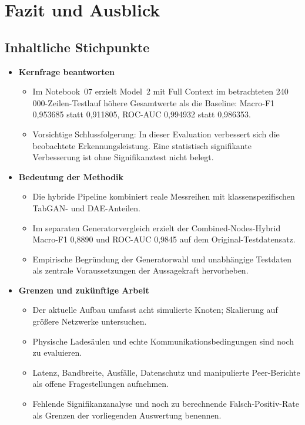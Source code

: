 \section{Fazit und Ausblick}
\label{sec:conclusion}

\subsection{Inhaltliche Stichpunkte}
\begin{itemize}
  \item \textbf{Kernfrage beantworten}
  \begin{itemize}
    \item Im Notebook~07 erzielt Model~2 mit Full Context im betrachteten
          240\,000-Zeilen-Testlauf höhere Gesamtwerte als die Baseline:
          Macro-F1 0{,}953685 statt 0{,}911805, ROC-AUC 0{,}994932 statt
          0{,}986353.
    \item Vorsichtige Schlussfolgerung: In dieser Evaluation verbessert
          sich die beobachtete Erkennungsleistung. Eine statistisch
          signifikante Verbesserung ist ohne Signifikanztest nicht belegt.
  \end{itemize}
  \item \textbf{Bedeutung der Methodik}
  \begin{itemize}
    \item Die hybride Pipeline kombiniert reale Messreihen mit
          klassenspezifischen TabGAN- und DAE-Anteilen.
    \item Im separaten Generatorvergleich erzielt der Combined-Nodes-Hybrid
          Macro-F1 0{,}8890 und ROC-AUC 0{,}9845 auf dem Original-Testdatensatz.
    \item Empirische Begründung der Generatorwahl und unabhängige
          Testdaten als zentrale Voraussetzungen der Aussagekraft hervorheben.
  \end{itemize}
  \item \textbf{Grenzen und zukünftige Arbeit}
  \begin{itemize}
    \item Der aktuelle Aufbau umfasst acht simulierte Knoten; Skalierung auf
          größere Netzwerke untersuchen.
    \item Physische Ladesäulen und echte Kommunikationsbedingungen sind
          noch zu evaluieren.
    \item Latenz, Bandbreite, Ausfälle, Datenschutz und manipulierte
          Peer-Berichte als offene Fragestellungen aufnehmen.
    \item Fehlende Signifikanzanalyse und noch zu berechnende
          Falsch-Positiv-Rate als Grenzen der vorliegenden Auswertung benennen.
  \end{itemize}
\end{itemize}

